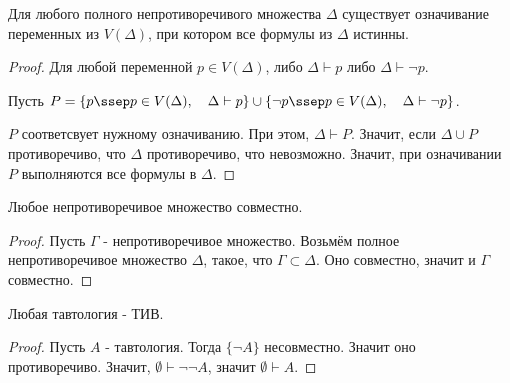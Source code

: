 \begin{lemma} \thmslashn

    Для любого полного непротиворечивого множества $\Delta$ существует означивание переменных из $V(\Delta)$, при котором все формулы из $\Delta$ истинны.
    \begin{proof} \thmslashn
    
        Для любой переменной $p\in V(\Delta)$, либо $\Delta \vdash p$ либо  $\Delta \vdash \neg p$. 

        Пусть $P = \{p \ssep p\in V(\Delta), \quad \Delta \vdash p\} \cup \{\neg p \ssep p\in V(\Delta), \quad \Delta \vdash \neg p\}$.

        $P$ соответсвует нужному означиванию. При этом, $\Delta \vdash P$. Значит, если $\Delta \cup P$ противоречиво, что $\Delta$ противоречиво, что невозможно. Значит, при означивании $P$ выполняются все формулы в $\Delta$.
    \end{proof}
\end{lemma}
\begin{theorem} \thmslashn

    Любое непротиворечивое множество совместно.

    \begin{proof} \thmslashn
    
        Пусть $\Gamma$ - непротиворечивое множество. Возьмём полное непротиворечивое множество $\Delta$, такое, что $\Gamma \subset \Delta$. Оно совместно, значит и $\Gamma$ совместно.
    \end{proof}
\end{theorem}
\begin{consequence} \thmslashn

    Любая тавтология - ТИВ.
    \begin{proof} \thmslashn
    
        Пусть $A$ - тавтология. Тогда $\{\neg A\} $ несовместно. Значит оно противоречиво. Значит, $ \emptyset \vdash \neg \neg A$, значит $ \emptyset \vdash A$.
    \end{proof}
\end{consequence}
